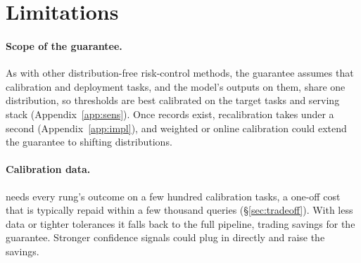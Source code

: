 \section*{Limitations}

\paragraph{Scope of the guarantee.} As with other distribution-free risk-control methods, the
guarantee assumes that calibration and deployment tasks, and the model's outputs on them, share one
distribution, so thresholds are best calibrated on the target tasks and serving stack
(Appendix~\ref{app:sens}). Once records exist, recalibration takes under a second (Appendix~\ref{app:impl}), and weighted
or online calibration could extend the guarantee to shifting distributions.

\paragraph{Calibration data.} \climb{} needs every rung's outcome on a few hundred calibration tasks, a
one-off cost that is typically repaid within a few thousand queries (\S\ref{sec:tradeoff}). With less data or
tighter tolerances it falls back to the full pipeline, trading savings for the guarantee. Stronger
confidence signals could plug in directly and raise the savings.
